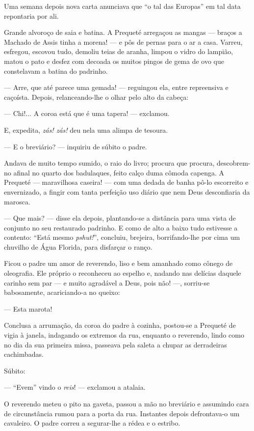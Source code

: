 Uma semana depois nova carta anunciava que ``o tal das Europas'' em tal
data repontaria por ali.

Grande alvoroço de saia e batina. A Prequeté arregaçou as mangas ---
braços a Machado de Assis tinha a morena! --- e pôs de pernas para o ar
a casa. Varreu, esfregou, escovou tudo, demoliu teias de aranha, limpou
o vidro do lampião, matou o pato e desfez com decoada os muitos pingos
de gema de ovo que constelavam a batina do padrinho.

--- Arre, que até parece uma gemada! --- reguingou ela, entre
repreensiva e caçoísta. Depois, relanceando-lhe o olhar pelo alto da
cabeça:

--- Chi!... A coroa está que é uma tapera! --- exclamou.

E, expedita, \emph{zás! zás!} deu nela uma alimpa de tesoura.

--- E o breviário? --- inquiriu de súbito o padre.

Andava de muito tempo sumido, o raio do livro; procura que procura,
descobrem-no afinal no quarto dos badulaques, feito calço duma cômoda
capenga. A Prequeté --- maravilhosa caseira! --- com uma dedada de banha
pô-lo escorreito e envernizado, a fingir com tanta perfeição uso diário
que nem Deus desconfiaria da marosca.

--- Que mais? --- disse ela depois, plantando-se a distância para uma
vista de conjunto no seu restaurado padrinho. E como de alto a baixo
tudo estivesse a contento: ``Está mesmo \emph{pshut!}'', concluiu,
brejeira, borrifando-lhe por cima um chuvilho de Água Florida, para
disfarçar o ranço.

Ficou o padre um amor de reverendo, liso e bem amanhado como cônego de
oleografia. Ele próprio o reconheceu ao espelho e, nadando nas delícias
daquele carinho sem par --- e muito agradável a Deus, pois não! ---,
sorriu-se babosamente, acariciando-a no queixo:

--- Esta marota!

Conclusa a arrumação, da coroa do padre à cozinha, postou-se a Prequeté
de vigia à janela, indagando os extremos da rua, enquanto o reverendo,
lindo como no dia da sua primeira missa, passeava pela saleta a chupar
as derradeiras cachimbadas.

Súbito:

--- ``Evem'' vindo o \emph{reis}! --- exclamou a atalaia.

O reverendo meteu o pito na gaveta, passou a mão no breviário e
assumindo cara de circunstância rumou para a porta da rua. Instantes
depois defrontava-o um cavaleiro. O padre correu a segurar-lhe a rédea e
o estribo.

